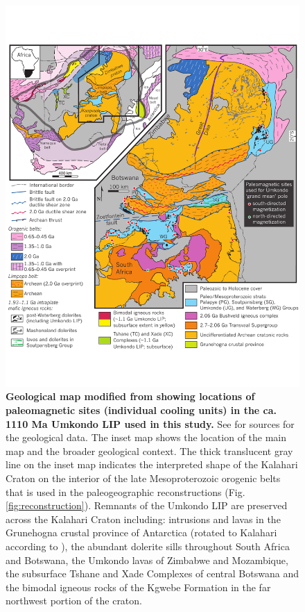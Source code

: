 \documentclass[11pt,letterpaper]{article}
\begin{document}
\begin{figure}[h!]
\includegraphics[width=5.7 in]{figures/Umkondo_locality_map.pdf}
\caption{\textbf{ Geological map modified from \cite{Hanson2011b} showing locations of paleomagnetic sites (individual cooling units) in the ca. 1110 Ma Umkondo LIP used in this study.} See \cite{Hanson2011b} for sources for the geological data. The inset map shows the location of the main map and the broader geological context. The thick translucent gray line on the inset map indicates the interpreted shape of the Kalahari Craton on the interior of the late Mesoproterozoic orogenic belts that is used in the paleogeographic reconstructions (Fig. \ref{fig:reconstruction}). Remnants of the Umkondo LIP are preserved across the Kalahari Craton including: intrusions and lavas in the Grunehogna crustal province of Antarctica (rotated to Kalahari according to \citealt{Evans2009a}), the abundant dolerite sills throughout South Africa and Botswana, the Umkondo lavas of Zimbabwe and Mozambique, the subsurface Tshane and Xade Complexes of central Botswana and the bimodal igneous rocks of the Kgwebe Formation in the far northwest portion of the craton.}
\label{fig:map}
\end{figure}
\end{document}
